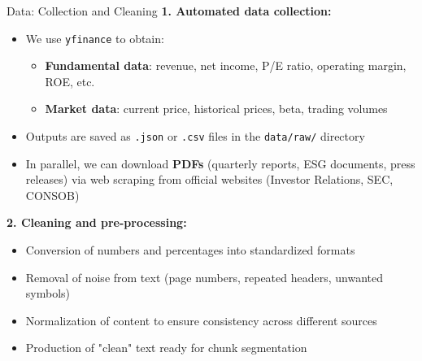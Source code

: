 \documentclass[aspectratio=169,xcolor=dvipsnames]{beamer}
\begin{document}
\begin{frame}{Data: Collection and Cleaning}
  \textbf{1. Automated data collection:}
  \begin{itemize}
      \item We use \texttt{yfinance} to obtain:
      \begin{itemize}
          \item \textbf{Fundamental data}: revenue, net income, P/E ratio, operating margin, ROE, etc.
          \item \textbf{Market data}: current price, historical prices, beta, trading volumes
      \end{itemize}
      \item Outputs are saved as \texttt{.json} or \texttt{.csv} files in the \texttt{data/raw/} directory
      \item In parallel, we can download \textbf{PDFs} (quarterly reports, ESG documents, press releases) via web scraping from official websites (Investor Relations, SEC, CONSOB)
  \end{itemize}
  
  \vspace{0.2cm}
  \textbf{2. Cleaning and pre-processing:}
  \begin{itemize}
      \item Conversion of numbers and percentages into standardized formats
      \item Removal of noise from text (page numbers, repeated headers, unwanted symbols)
      \item Normalization of content to ensure consistency across different sources
      \item Production of "clean" text ready for chunk segmentation
  \end{itemize}
\end{frame}
\end{document}
